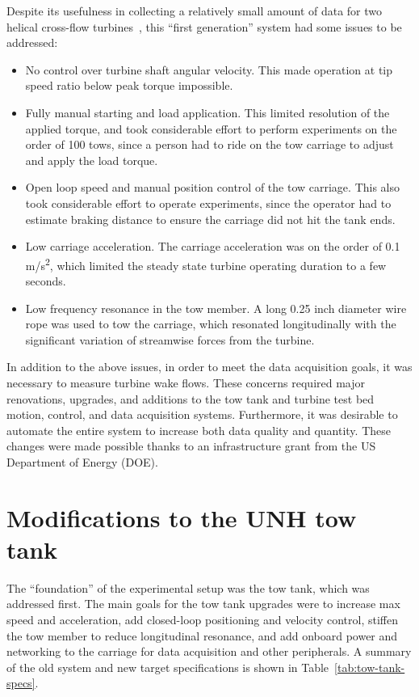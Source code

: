 Despite its usefulness in collecting a relatively small amount of data for two
helical cross-flow turbines~\cite{Bachant2015-RE}, this ``first generation''
system had some issues to be addressed:
\begin{itemize}
    \item No control over turbine shaft angular velocity. This made operation at
    tip speed ratio below peak torque impossible.

    \item Fully manual starting and load application. This limited resolution of
    the applied torque, and took considerable effort to perform experiments on
    the order of 100 tows, since a person had to ride on the tow carriage to
    adjust and apply the load torque.

    \item Open loop speed and manual position control of the tow carriage. This
    also took considerable effort to operate experiments, since the operator had
    to estimate braking distance to ensure the carriage did not hit the tank
    ends.

    \item Low carriage acceleration. The carriage acceleration was on the order
    of 0.1 m/s\textsuperscript{2}, which limited the steady state turbine
    operating duration to a few seconds.

    \item Low frequency resonance in the tow member. A long 0.25 inch diameter
    wire rope was used to tow the carriage, which resonated longitudinally with
    the significant variation of streamwise forces from the turbine.
\end{itemize}

In addition to the above issues, in order to meet the data acquisition goals, it
was necessary to measure turbine wake flows. These concerns required major
renovations, upgrades, and additions to the tow tank and turbine test bed
motion, control, and data acquisition systems. Furthermore, it was desirable to
automate the entire system to increase both data quality and quantity. These
changes were made possible thanks to an infrastructure grant from the US
Department of Energy (DOE).


\section{Modifications to the UNH tow tank}

The ``foundation'' of the experimental setup was the tow tank, which was
addressed first. The main goals for the tow tank upgrades were to increase max
speed and acceleration, add closed-loop positioning and velocity control,
stiffen the tow member to reduce longitudinal resonance, and add onboard power
and networking to the carriage for data acquisition and other peripherals. A
summary of the old system and new target specifications is shown in
Table~\ref{tab:tow-tank-specs}.

